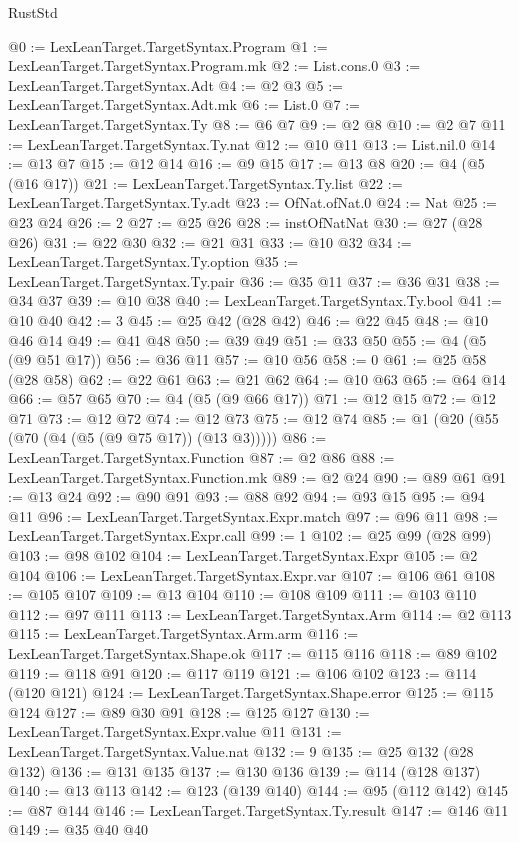 \begin{lexlean}{RustStd}
\begin{coremodule}
{\begin{coremodule}
{{{{{{{{{{{{{{{{{{{{{{{{{{{{{{{{{{@0 := LexLeanTarget.TargetSyntax.Program
@1 := LexLeanTarget.TargetSyntax.Program.mk
@2 := List.cons.{0}
@3 := LexLeanTarget.TargetSyntax.Adt
@4 := @2 @3
@5 := LexLeanTarget.TargetSyntax.Adt.mk
@6 := List.{0}
@7 := LexLeanTarget.TargetSyntax.Ty
@8 := @6 @7
@9 := @2 @8
@10 := @2 @7
@11 := LexLeanTarget.TargetSyntax.Ty.nat
@12 := @10 @11
@13 := List.nil.{0}
@14 := @13 @7
@15 := @12 @14
@16 := @9 @15
@17 := @13 @8
@20 := @4 (@5 (@16 @17))
@21 := LexLeanTarget.TargetSyntax.Ty.list
@22 := LexLeanTarget.TargetSyntax.Ty.adt
@23 := OfNat.ofNat.{0}
@24 := Nat
@25 := @23 @24
@26 := 2
@27 := @25 @26
@28 := instOfNatNat
@30 := @27 (@28 @26)
@31 := @22 @30
@32 := @21 @31
@33 := @10 @32
@34 := LexLeanTarget.TargetSyntax.Ty.option
@35 := LexLeanTarget.TargetSyntax.Ty.pair
@36 := @35 @11
@37 := @36 @31
@38 := @34 @37
@39 := @10 @38
@40 := LexLeanTarget.TargetSyntax.Ty.bool
@41 := @10 @40
@42 := 3
@45 := @25 @42 (@28 @42)
@46 := @22 @45
@48 := @10 @46 @14
@49 := @41 @48
@50 := @39 @49
@51 := @33 @50
@55 := @4 (@5 (@9 @51 @17))
@56 := @36 @11
@57 := @10 @56
@58 := 0
@61 := @25 @58 (@28 @58)
@62 := @22 @61
@63 := @21 @62
@64 := @10 @63
@65 := @64 @14
@66 := @57 @65
@70 := @4 (@5 (@9 @66 @17))
@71 := @12 @15
@72 := @12 @71
@73 := @12 @72
@74 := @12 @73
@75 := @12 @74
@85 := @1 (@20 (@55 (@70 (@4 (@5 (@9 @75 @17)) (@13 @3)))))
@86 := LexLeanTarget.TargetSyntax.Function
@87 := @2 @86
@88 := LexLeanTarget.TargetSyntax.Function.mk
@89 := @2 @24
@90 := @89 @61
@91 := @13 @24
@92 := @90 @91
@93 := @88 @92
@94 := @93 @15
@95 := @94 @11
@96 := LexLeanTarget.TargetSyntax.Expr.match
@97 := @96 @11
@98 := LexLeanTarget.TargetSyntax.Expr.call
@99 := 1
@102 := @25 @99 (@28 @99)
@103 := @98 @102
@104 := LexLeanTarget.TargetSyntax.Expr
@105 := @2 @104
@106 := LexLeanTarget.TargetSyntax.Expr.var
@107 := @106 @61
@108 := @105 @107
@109 := @13 @104
@110 := @108 @109
@111 := @103 @110
@112 := @97 @111
@113 := LexLeanTarget.TargetSyntax.Arm
@114 := @2 @113
@115 := LexLeanTarget.TargetSyntax.Arm.arm
@116 := LexLeanTarget.TargetSyntax.Shape.ok
@117 := @115 @116
@118 := @89 @102
@119 := @118 @91
@120 := @117 @119
@121 := @106 @102
@123 := @114 (@120 @121)
@124 := LexLeanTarget.TargetSyntax.Shape.error
@125 := @115 @124
@127 := @89 @30 @91
@128 := @125 @127
@130 := LexLeanTarget.TargetSyntax.Expr.value @11
@131 := LexLeanTarget.TargetSyntax.Value.nat
@132 := 9
@135 := @25 @132 (@28 @132)
@136 := @131 @135
@137 := @130 @136
@139 := @114 (@128 @137)
@140 := @13 @113
@142 := @123 (@139 @140)
@144 := @95 (@112 @142)
@145 := @87 @144
@146 := LexLeanTarget.TargetSyntax.Ty.result
@147 := @146 @11
@149 := @35 @40 @40
}}}}}}}}}}}}}}}}}}}}}}}}}}}}}}}}}}
\end{coremodule}}
\end{coremodule}
\end{lexlean}
